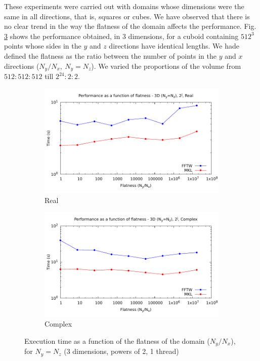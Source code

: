 \documentclass[12pt, a4paper]{article}
\begin{document}
These experiments were carried out with domains whose dimensions were the same in all directions, that is, squares or cubes. We have observed that there is no clear trend in the way the flatness of the domain affects the performance. Fig. \ref{FLATNESS} shows the performance obtained, in 3 dimensions, for a cuboid containing $512^3$ points whose sides in the $y$ and $z$ directions have identical lengths. We hade defined the flatness as the ratio between the number of points in the $y$ and $x$ directions ($N_y/N_x,\ N_y=N_z$). We varied the proportions of the volume from $512:512:512$ till $2^{24}:2:2$.  \\

\begin{figure}[H]
\captionsetup{width=0.8\linewidth}
\centering
\begin{subfigure}{.5\textwidth}
\centering
\includegraphics[width=.9\linewidth]{graphs/performance/3d-flatness-pow2-r.pdf}
\caption{Real}
\label{FLATNESSR}
\end{subfigure}%
\begin{subfigure}{.5\textwidth}
\centering
\includegraphics[width=.9\linewidth]{graphs/performance/3d-flatness-pow2-c.pdf}
\caption{Complex}
\label{FLATNESSC}
\end{subfigure}
\caption{Execution time as a function of the flatness of the domain ($N_y/N_x$), for $N_y=N_z$ (3 dimensions, powers of 2, 1 thread)}
\label{FLATNESS}
\end{figure}
\end{document}
